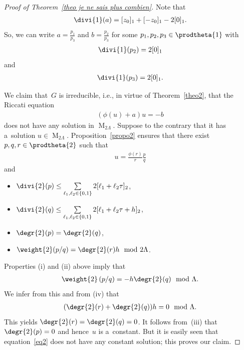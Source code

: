 \documentclass[pdftex]{sigma}
\numberwithin{equation}{section}
\begin{document}
\begin{proof}[Proof of Theorem~\ref{theo je ne sais plus combien}] Note that
\begin{gather*}
\divi{1} (a)=[z_{0}]_{1}+[-z_{0}]_{1}-2[0]_{1}.
\end{gather*}
So, we can write $a=\frac{p_{1}}{p_{3}}$ and $b=\frac{p_{2}}{p_{3}}$ for some $p_{1},p_{2},p_{3}\in \prodtheta{1}$ with
\begin{gather*}
\divi{1} (p_{2})=2[0]_{1}
\end{gather*}
and
\begin{gather*}
\divi{1} (p_{3})=2[0]_{1}.
\end{gather*}

We claim that~$G$ is irreducible, i.e., in virtue of Theorem~\ref{theo2}, that the Riccati equation
\begin{gather}
\label{eq2}
(\phi(u)+a)u=-b
\end{gather}
does not have any solution in $\operatorname{M}_{2\Lambda}$.
Suppose to the contrary that it has a~solution $u \in \operatorname{M}_{2\Lambda}$.
Proposition~\ref{propo2} ensures that there exist $p,q, r\in \prodtheta{2}$ such that
\begin{gather*}
u= \frac{\phi(r)}{r}\frac{p}{q}
\end{gather*}
and
\begin{itemize}
\itemsep=0pt
\item[(i)] $\divi{2} (p) \leq \sum\limits_{\ell_{1},\ell_{2} \in \{0,1\}}2[\ell_{1}+\ell_{2}\tau]_{2}$,
\item[(ii)] $\divi{2} (q) \leq \sum\limits_{\ell_{1},\ell_{2} \in \{0,1\}}2[\ell_{1}+\ell_{2}\tau+h]_{2}$,
\item[(iii)] $\degr{2} (p)=\degr{2} (q)$,
\item[(iv)] $\weight{2} (p/q)=\degr{2} (r) h \mod 2\Lambda$.
\end{itemize}
Properties (i) and (ii) above imply that
\begin{gather*}
\weight{2} \left(p/q\right) =-h\degr{2} (q) \mod \Lambda.
\end{gather*}
We infer from this and from (iv) that
\begin{gather*}
(\degr{2} (r) + \degr{2} (q))h =0 \mod \Lambda.
\end{gather*}
This yields $\degr{2} (r) = \degr{2} (q)=0$.
It follows from~(iii) that $ \degr{2} (p)=0$ and hence~$u$ is a~constant.
But it is easily seen that equation~\eqref{eq2} does not have any constant solution; this proves our claim.


\end{proof}
\end{document}
